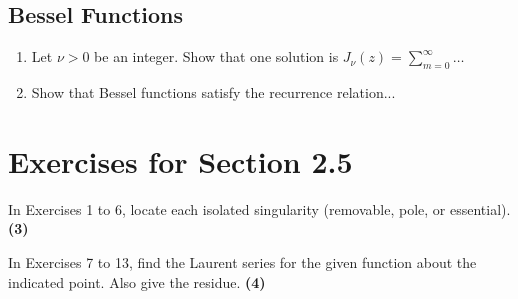 \documentclass[12pt]{article}
\theoremstyle{definition} %
\theoremstyle{plain} %
\begin{document}
\subsection*{Bessel Functions}
\begin{enumerate}
    \item Let $\nu>0$ be an integer. Show that one solution is $J_\nu(z)=\sum_{m=0}^\infty \dots$
    \item Show that Bessel functions satisfy the recurrence relation...
\end{enumerate}

\section*{Exercises for Section 2.5}

In Exercises 1 to 6, locate each isolated singularity (removable, pole, or essential). \quad \textbf{(3)}

In Exercises 7 to 13, find the Laurent series for the given function about the indicated point. Also give the residue. \quad \textbf{(4)}
\end{document}
